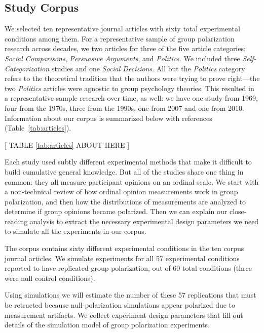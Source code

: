 \documentclass[preview]{article}
\begin{document}
\subsection{Study Corpus} 

We selected ten representative journal articles with sixty total experimental
conditions among them. For a representative sample of group polarization
research across decades, we two articles for three of the five article
categories: \emph{Social Comparisons}, \emph{Persuasive Arguments},
 and \emph{Politics}. We included three \emph{Self-Categorization} studies and one \emph{Social Decisions}.
All but the \emph{Politics} category refers to the theoretical tradition that the
authors were trying to prove right—the two \emph{Politics} articles were agnostic
to group psychology theories. This resulted in a representative sample research
over time, as well: we have one study from 1969,
four from the 1970s, three from the 1990s, one from 2007 and one from 2010. 
Information about our corpus is summarized below with references 
(Table~\ref{tab:articles}).  

\begin{center}
[ TABLE \ref{tab:articles} ABOUT HERE ]
\end{center}

Each study used subtly different experimental methods that make it difficult
to build cumulative general knowledge. But all of the studies share one thing
in common: they all measure participant opinions on an ordinal scale. We start
with a non-technical review of how ordinal opinion measurements work in group
polarization, and then how the distributions of measurements are analyzed to
determine if group opinions became polarized. Then we can explain our
close-reading analysis to extract the necessary experimental design parameters
we need to simulate all the experiments in our corpus. 

The corpus contains
sixty different experimental conditions in the ten corpus journal articles. We 
simulate experiments for all 57 experimental conditions reported to have 
replicated group polarization, out of 60 total conditions (three were
null control conditions). 

Using simulations we will estimate the number of these 57 replications that
must be retracted because null-polarization simulations appear polarized due
to measurement artifacts. We collect experiment design parameters that fill out 
details of the simulation model of group polarization experiments. 
\end{document}
